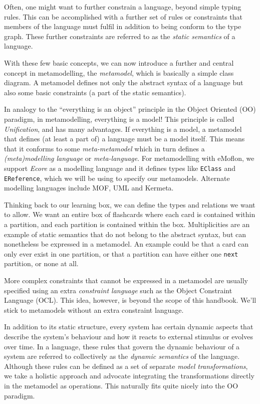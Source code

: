 Often, one might want to further constrain a language, beyond simple typing rules. This can be accomplished with a further set of rules or constraints that
members of the language must fulfil in addition to being conform to the type graph. These further constraints are referred to as the
\emph{static semantics} of a language.

With these few basic concepts, we can now introduce a further and central concept in metamodelling, the \emph{metamodel}, which is basically a
simple class diagram. A metamodel defines not only the abstract syntax of a language but also some basic constraints (a part of the static semantics).

In analogy to the ``everything is an object'' principle in the Object Oriented (OO) paradigm, in metamodelling, everything is a model! This
principle is called \emph{Unification},  and has many advantages. If everything is a model, a metamodel that defines (at least a part
of) a language must be a model itself. This means that it conforms to some \emph{meta-metamodel} which in turn defines a 
\emph{(meta)modelling language} or \emph{meta-language}. For metamodelling with eMoflon, we support \emph{Ecore} as a modelling language
and it defines types like \texttt{EClass} and \texttt{EReference}, which we will be using to specify  our metamodels. Alternate modelling languages include MOF,
UML and Kermeta.

Thinking back to our learning box, we can define the types and relations we want to allow. We want an entire box of flashcards where each card is contained
within a partition, and each partition is contained within the box. Multiplicities are an example of static semantics that do not belong to the abstract
syntax, but can nonetheless be expressed in a metamodel. An example could be that a card can only ever exist in one partition, or that a partition can have
either one \texttt{next} partition, or none at all.

More complex constraints that cannot be expressed in a metamodel are usually specified using an extra \emph{constraint language}
such as the Object Constraint Language (OCL). This idea, however,  is beyond the scope of this handbook. We'll stick to metamodels without an extra
constraint language.

In addition to its static structure, every system has certain dynamic aspects that describe the system's behaviour and how it reacts to external stimulus or
evolves over time. In a language, these rules that govern the dynamic behaviour of a system are referred to collectively as the
\emph{dynamic semantics} of the language. Although these rules can be defined as a set of separate \emph{model transformations}, we
take a holistic approach and advocate integrating the transformations directly in the metamodel as operations. This naturally fits quite nicely into the OO
paradigm.

